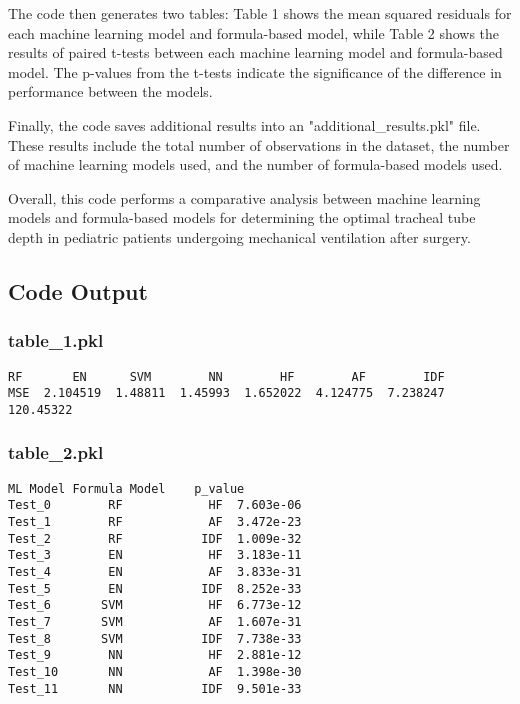 \documentclass[11pt]{article}
\begin{document}
The code then generates two tables: Table 1 shows the mean squared residuals for each machine learning model and formula-based model, while Table 2 shows the results of paired t-tests between each machine learning model and formula-based model. The p-values from the t-tests indicate the significance of the difference in performance between the models.

Finally, the code saves additional results into an "additional\_results.pkl" file. These results include the total number of observations in the dataset, the number of machine learning models used, and the number of formula-based models used.

Overall, this code performs a comparative analysis between machine learning models and formula-based models for determining the optimal tracheal tube depth in pediatric patients undergoing mechanical ventilation after surgery.

\subsection{Code Output}

\subsubsection*{table\_1.pkl}

\begin{Verbatim}[tabsize=4]
           RF       EN      SVM        NN        HF        AF        IDF
MSE  2.104519  1.48811  1.45993  1.652022  4.124775  7.238247  120.45322
\end{Verbatim}

\subsubsection*{table\_2.pkl}

\begin{Verbatim}[tabsize=4]
        ML Model Formula Model    p_value
Test_0        RF            HF  7.603e-06
Test_1        RF            AF  3.472e-23
Test_2        RF           IDF  1.009e-32
Test_3        EN            HF  3.183e-11
Test_4        EN            AF  3.833e-31
Test_5        EN           IDF  8.252e-33
Test_6       SVM            HF  6.773e-12
Test_7       SVM            AF  1.607e-31
Test_8       SVM           IDF  7.738e-33
Test_9        NN            HF  2.881e-12
Test_10       NN            AF  1.398e-30
Test_11       NN           IDF  9.501e-33
\end{Verbatim}
\end{document}
